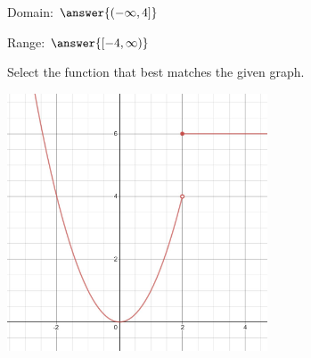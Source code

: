 \documentclass{ximera}
\begin{document}
\begin{problem}
\begin{enumerate}
 Domain: $\answer{(-\infty,4]}$
 
 Range: $\answer{[-4,\infty)}$
\end{enumerate}
\end{problem}

\begin{problem}\label{prob:160hom2prob4}
Select the function that best matches the given graph.
\begin{image}
   \includegraphics[height=3in]{160H2pic6.jpg}
 \end{image}
\begin{multipleChoice}  
\end{multipleChoice}  
\end{problem}
\end{document}
